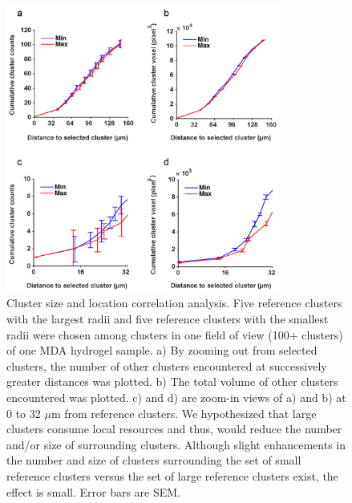 \begin{figure}
\centering
\includegraphics[keepaspectratio,width=0.8\textwidth]{./figures/10fM001_5ClusterZoomOut}
\caption[Cluster size and location correlation analysis]{Cluster size and location correlation analysis. Five reference clusters with the largest radii and five reference clusters with the smallest radii were chosen among clusters in one field of view (100+ clusters) of one MDA hydrogel sample. a) By zooming out from selected clusters, the number of other clusters encountered at successively greater distances was plotted. b) The total volume of other clusters encountered was plotted. c) and d) are zoom-in views of a) and b) at 0 to 32 $\mu$m from reference clusters. We hypothesized that large clusters consume local resources and thus, would reduce the number and/or size of surrounding clusters. Although slight enhancements in the number and size of clusters surrounding the set of small reference clusters versus the set of large reference clusters exist, the effect is small. Error bars are SEM.}
\label{fig:ClusterCorrelation}
\end{figure}


